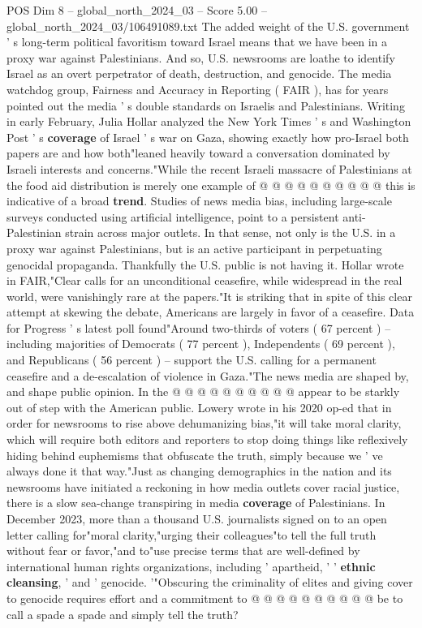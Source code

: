 \begin{textsample}{POS Dim 8 – global\_north\_2024\_03 – Score 5.00 – global\_north\_2024\_03/106491089.txt}
The added weight of the U.S. government ' s long-term political favoritism toward Israel means that we have been in a proxy war against Palestinians.
And so, U.S. newsrooms are loathe to identify Israel as an overt perpetrator of death, destruction, and genocide.
The media watchdog group, Fairness and Accuracy in Reporting ( FAIR ), has for years pointed out the media ' s double standards on Israelis and Palestinians.
Writing in early February, Julia Hollar analyzed the New York Times ' s and Washington Post ' s \textbf{coverage} of Israel ' s war on Gaza, showing exactly how pro-Israel both papers are and how both"leaned heavily toward a conversation dominated by Israeli interests and concerns."While the recent Israeli massacre of Palestinians at the food aid distribution is merely one example of @ @ @ @ @ @ @ @ @ @ this is indicative of a broad \textbf{trend}.
Studies of news media bias, including large-scale surveys conducted using artificial intelligence, point to a persistent anti-Palestinian strain across major outlets.
In that sense, not only is the U.S. in a proxy war against Palestinians, but is an active participant in perpetuating genocidal propaganda.
Thankfully the U.S. public is not having it.
Hollar wrote in FAIR,"Clear calls for an unconditional ceasefire, while widespread in the real world, were vanishingly rare at the papers."It is striking that in spite of this clear attempt at skewing the debate, Americans are largely in favor of a ceasefire.
Data for Progress ' s latest poll found"Around two-thirds of voters ( 67 percent ) -- including majorities of Democrats ( 77 percent ), Independents ( 69 percent ), and Republicans ( 56 percent ) -- support the U.S. calling for a permanent ceasefire and a de-escalation of violence in Gaza."The news media are shaped by, and shape public opinion.
In the @ @ @ @ @ @ @ @ @ @ appear to be starkly out of step with the American public.
Lowery wrote in his 2020 op-ed that in order for newsrooms to rise above dehumanizing bias,"it will take moral clarity, which will require both editors and reporters to stop doing things like reflexively hiding behind euphemisms that obfuscate the truth, simply because we ' ve always done it that way."Just as changing demographics in the nation and its newsrooms have initiated a reckoning in how media outlets cover racial justice, there is a slow sea-change transpiring in media \textbf{coverage} of Palestinians.
In December 2023, more than a thousand U.S. journalists signed on to an open letter calling for"moral clarity,"urging their colleagues"to tell the full truth without fear or favor,"and to"use precise terms that are well-defined by international human rights organizations, including ' apartheid, ' ' \textbf{ethnic} \textbf{cleansing}, ' and ' genocide. '"Obscuring the criminality of elites and giving cover to genocide requires effort and a commitment to @ @ @ @ @ @ @ @ @ @ be to call a spade a spade and simply tell the truth?

\end{textsample}
